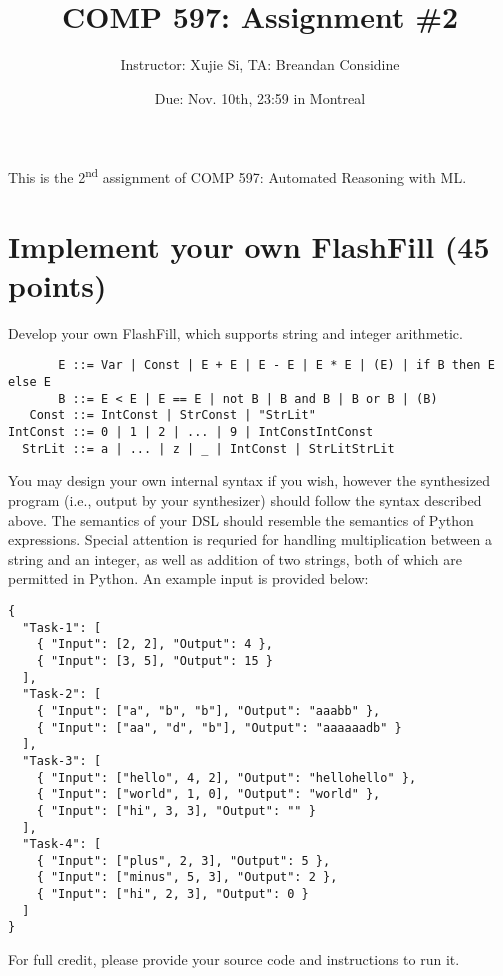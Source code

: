 \documentclass[11pt]{article}
\author{Instructor: Xujie Si, TA: Breandan Considine}
\date{Due: Nov. 10th, 23:59 in Montreal}
\title{COMP 597: Assignment \#2}
\begin{document}
    \maketitle
    \noindent This is the 2\textsuperscript{nd} assignment of COMP 597: Automated Reasoning with ML.

    \section{Implement your own FlashFill (45 points)}

    Develop your own FlashFill, which supports string and integer arithmetic.

    \begin{footnotesize}
    \begin{verbatim}
       E ::= Var | Const | E + E | E - E | E * E | (E) | if B then E else E
       B ::= E < E | E == E | not B | B and B | B or B | (B)
   Const ::= IntConst | StrConst | "StrLit"
IntConst ::= 0 | 1 | 2 | ... | 9 | IntConstIntConst
  StrLit ::= a | ... | z | _ | IntConst | StrLitStrLit
    \end{verbatim}
    \end{footnotesize}

    \noindent You may design your own internal syntax if you wish, however the synthesized program (i.e., output by your synthesizer) should follow the syntax described above. The semantics of your DSL should resemble the semantics of Python expressions. Special attention is requried for handling multiplication between a string and an integer, as well as addition of two strings, both of which are permitted in Python. An example input is provided below:

    \begin{lstlisting}[basicstyle=\ttfamily\tiny]
{
  "Task-1": [
    { "Input": [2, 2], "Output": 4 },
    { "Input": [3, 5], "Output": 15 }
  ],
  "Task-2": [
    { "Input": ["a", "b", "b"], "Output": "aaabb" },
    { "Input": ["aa", "d", "b"], "Output": "aaaaaadb" }
  ],
  "Task-3": [
    { "Input": ["hello", 4, 2], "Output": "hellohello" },
    { "Input": ["world", 1, 0], "Output": "world" },
    { "Input": ["hi", 3, 3], "Output": "" }
  ],
  "Task-4": [
    { "Input": ["plus", 2, 3], "Output": 5 },
    { "Input": ["minus", 5, 3], "Output": 2 },
    { "Input": ["hi", 2, 3], "Output": 0 }
  ]
}
    \end{lstlisting}

    \noindent For full credit, please provide your source code and instructions to run it.
\end{document}
